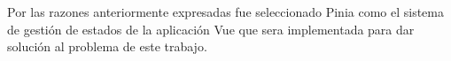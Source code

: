 Por las razones anteriormente expresadas fue seleccionado Pinia como el sistema de gestión de estados de la aplicación Vue que sera implementada para dar solución al problema de este trabajo.






